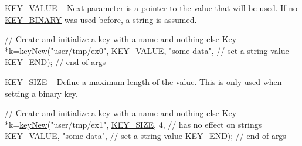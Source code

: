 \begin{DoxyItemize}
\item \hyperlink{group__key_gga91fb3178848bd682000958089abbaf40ac66e4a49d09212b79f5754ca6db5bd2e}{K\+E\+Y\+\_\+\+V\+A\+L\+UE} ~\newline
 Next parameter is a pointer to the value that will be used. If no \hyperlink{group__key_gga91fb3178848bd682000958089abbaf40a1ca18d4e094ae7487d35ecedda2235ff}{K\+E\+Y\+\_\+\+B\+I\+N\+A\+RY} was used before, a string is assumed. 
\begin{DoxyCodeInclude}
\textcolor{comment}{// Create and initialize a key with a name and nothing else}
\hyperlink{classkdb_1_1Key_a5679f5cae63caddd64a60388b9cc77fa}{Key} *k=\hyperlink{group__key_gad23c65b44bf48d773759e1f9a4d43b89}{keyNew}(\textcolor{stringliteral}{"user/tmp/ex0"},
        \hyperlink{group__key_gga91fb3178848bd682000958089abbaf40ac66e4a49d09212b79f5754ca6db5bd2e}{KEY\_VALUE}, \textcolor{stringliteral}{"some data"},    \textcolor{comment}{// set a string value}
        \hyperlink{group__key_gga91fb3178848bd682000958089abbaf40aa8adb6fcb92dec58fb19410eacfdd403}{KEY\_END});                  \textcolor{comment}{// end of args}
\end{DoxyCodeInclude}

\item \hyperlink{group__key_gga91fb3178848bd682000958089abbaf40a6d531b5c41445d19d0452eebdccbfa01}{K\+E\+Y\+\_\+\+S\+I\+ZE} ~\newline
 Define a maximum length of the value. This is only used when setting a binary key. 
\begin{DoxyCodeInclude}
\textcolor{comment}{// Create and initialize a key with a name and nothing else}
\hyperlink{classkdb_1_1Key_a5679f5cae63caddd64a60388b9cc77fa}{Key} *k=\hyperlink{group__key_gad23c65b44bf48d773759e1f9a4d43b89}{keyNew}(\textcolor{stringliteral}{"user/tmp/ex1"},
        \hyperlink{group__key_gga91fb3178848bd682000958089abbaf40a6d531b5c41445d19d0452eebdccbfa01}{KEY\_SIZE}, 4,               \textcolor{comment}{// has no effect on strings}
        \hyperlink{group__key_gga91fb3178848bd682000958089abbaf40ac66e4a49d09212b79f5754ca6db5bd2e}{KEY\_VALUE}, \textcolor{stringliteral}{"some data"},    \textcolor{comment}{// set a string value}
        \hyperlink{group__key_gga91fb3178848bd682000958089abbaf40aa8adb6fcb92dec58fb19410eacfdd403}{KEY\_END});                  \textcolor{comment}{// end of args}
\end{DoxyCodeInclude}


\end{DoxyItemize}
